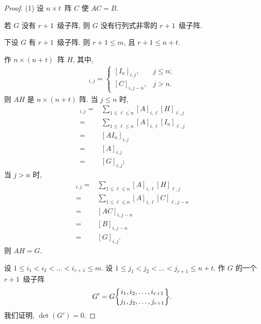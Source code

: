 \documentclass[../libro.tex]{subfiles}
\begin{document}
\begin{proof}
    (1)
    设 \(n \times t\)~阵 \(C\) 使 \(A C = B\).

    若 \(G\) 没有 \(r + 1\)~级子阵,
    则 \(G\) 没有行列式非零的 \(r + 1\)~级子阵.

    下设 \(G\) 有 \(r + 1\)~级子阵.
    则 \(r + 1 \leq m\),
    且 \(r + 1 \leq n + t\).

    作 \(n \times (n + t)\)~阵 \(H\),
    其中,
    \begin{align*}
        [H]_{i,j} =
        \begin{cases}
            [I_n]_{i,j}, & j \leq n; \\
            [C]_{i,j-n}, & j > n.
        \end{cases}
    \end{align*}
    则 \(AH\) 是 \(n \times (n + t)\) 阵.
    当 \(j \leq n\) 时,
    \begin{align*}
        [A H]_{i,j}
        = {} &
        \sum_{1 \leq \ell \leq n}
        {[A]_{i,\ell} [H]_{\ell,j}}
        \\
        = {} &
        \sum_{1 \leq \ell \leq n}
        {[A]_{i,\ell} [I_n]_{\ell,j}}
        \\
        = {} &
        [A I_n]_{i,j}
        \\
        = {} &
        [A]_{i,j}
        \\
        = {} &
        [G]_{i,j};
    \end{align*}
    当 \(j > n\) 时,
    \begin{align*}
        [A H]_{i,j}
        = {} &
        \sum_{1 \leq \ell \leq n}
        {[A]_{i,\ell} [H]_{\ell,j}}
        \\
        = {} &
        \sum_{1 \leq \ell \leq n}
        {[A]_{i,\ell} [C]_{\ell,j-n}}
        \\
        = {} &
        [A C]_{i,j-n}
        \\
        = {} &
        [B]_{i,j-n}
        \\
        = {} &
        [G]_{i,j}.
    \end{align*}
    则 \(AH = G\).

    设 \(1 \leq i_1 < i_2 < \dots < i_{r+1} \leq m\).
    设 \(1 \leq j_1 < j_2 < \dots < j_{r+1} \leq n+t\).
    作 \(G\) 的一个 \(r + 1\)~级子阵
    \begin{align*}
        G' = G\submat{i_1,i_2,\dots,i_{r+1}}{j_1,j_2,\dots,j_{r+1}}.
    \end{align*}
    我们证明, \(\det {(G')} = 0\).


\end{proof}
\end{document}
